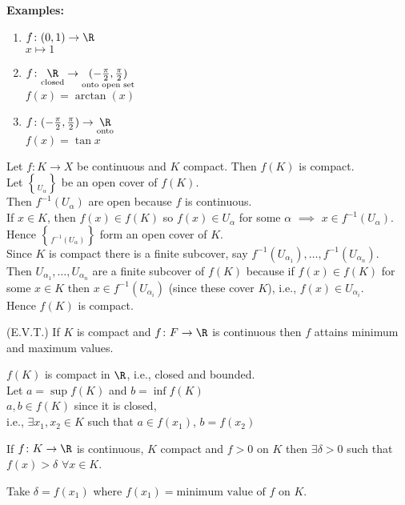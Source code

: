 \textbf{Examples: }\begin{enumerate}
\item $f\colon (0,1)\to\R$ \\
$x\mapsto 1$
\item $f\colon \underset{\text{closed}}{\R}\to\underset{\text{onto open set}}{(-\frac\pi2,\frac\pi2)}$ \\
$f(x)=\arctan(x)$
\item $f\colon (-\frac\pi2,\frac\pi2)\to\underset{\text{onto}}{\R}$ \\
$f(x)=\tan x$
\end{enumerate}
\thm Let $f\colon K\to X$ be continuous and $K$ compact.  Then $f(K)$ is compact. \\
\pf Let $\brace{U_\alpha}$ be an open cover of $f(K)$. \\
Then $f^{-1}(U_\alpha)$ are open because $f$ is continuous. \\
If $x\in K$, then $f(x)\in f(K)$ so $f(x)\in U_\alpha$ for some $\alpha$ $\implies$ $x\in f^{-1}(U_\alpha)$.  Hence $\brace{f^{-1}(U_\alpha)}$ form an open cover of $K$. \\
Since $K$ is compact there is a finite subcover, say $f^{-1}(U_{\alpha_1}),\dotsc,f^{-1}(U_{\alpha_n})$. \\
Then $U_{\alpha_1},\dotsc,U_{\alpha_n}$ are a finite subcover of $f(K)$ because if $f(x)\in f(K)$ for some $x\in K$ then $x\in f^{-1}(U_{\alpha_i})$ (since these cover $K$), i.e., $f(x)\in U_{\alpha_i}$. \\
Hence $f(K)$ is compact.

\cor (E.V.T.) If $K$ is compact and $f\colon F\to\R$ is continuous then $f$ attains minimum and maximum values.

\pf $f(K)$ is compact in $\R$, i.e., closed and bounded. \\
Let $a=\sup f(K)$ and $b=\inf f(K)$ \\
$a,b\in f(K)$ since it is closed, \\
i.e., $\exists x_1,x_2\in K$ such that $a\in f(x_1)$, $b=f(x_2)$

\cor If $f\colon K\to\R$ is continuous, $K$ compact and $f>0$ on $K$ then $\exists\delta>0$ such that $f(x)>\delta$ $\forall x\in K$.

\pf Take $\delta=f(x_1)$ where $f(x_1)=\text{minimum value of $f$ on $K$}$.

